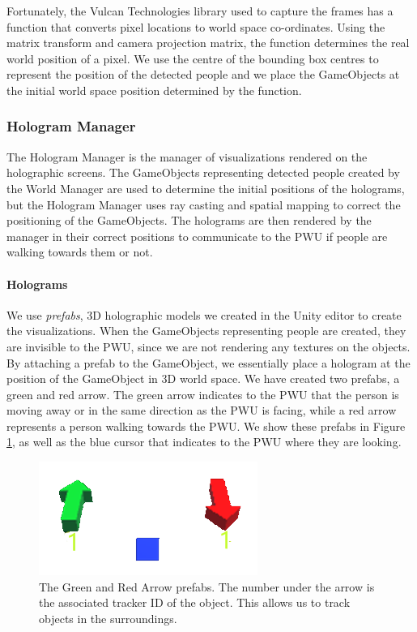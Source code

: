 Fortunately, the Vulcan Technologies library used to capture the frames has a function that converts pixel locations to world space co-ordinates. Using the  matrix transform and camera projection matrix, the  function determines the real world position of a pixel. We use the centre of the bounding box centres to represent the position of the detected people and we place the GameObjects at the initial world space position determined by the function.

\subsubsection{Hologram Manager}
The Hologram Manager is the manager of visualizations rendered on the holographic screens. The GameObjects representing detected people created by the World Manager are used to determine the initial positions of the holograms, but the Hologram Manager uses ray casting and spatial mapping to correct the positioning of the GameObjects. The holograms are then rendered by the manager in their correct positions to communicate to the PWU if people are walking towards them or not.

\paragraph{Holograms} We use \textit{prefabs}, 3D holographic models we created in the Unity editor to create the visualizations. When the GameObjects representing people are created, they are invisible to the PWU, since we are not rendering any textures on the objects. By attaching a prefab to the GameObject, we essentially place a hologram at the position of the GameObject in 3D world space. We have created two prefabs, a green and red arrow. The green arrow indicates to the PWU that the person is moving away or in the same direction as the PWU is facing, while a red arrow represents a person walking towards the PWU. We show these prefabs in Figure \ref{fig:holograms}, as well as the blue cursor that indicates to the PWU where they are looking.

\begin{figure}[ht]
	\centering
	\includegraphics[width=0.5\linewidth]{img/chapter5_implementation/greenredholowhite.png}
	\caption{The Green and Red Arrow prefabs. The number under the arrow is the associated tracker ID of the object. This allows us to track objects in the surroundings.}
	\label{fig:holograms}
\end{figure}

